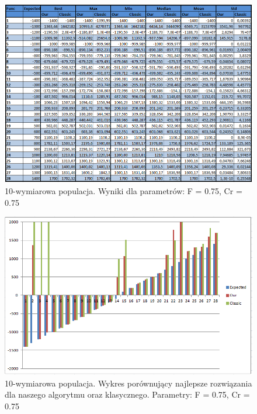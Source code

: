 \documentclass[a4paper]{article}
\begin{document}
\begin{figure}
\centering
\includegraphics[width=\textwidth]{F75Cr75L10tab.png}
\caption{10-wymiarowa populacja. Wyniki dla parametrów: F = 0.75, Cr = 0.75}
\end{figure}

\begin{figure}
\centering
\includegraphics[width=\textwidth]{F75Cr75L10chart.png}
\caption{10-wymiarowa populacja. Wykres porównujący najlepsze rozwiązania dla naszego algorytmu oraz klasycznego. Parametry: F = 0.75, Cr = 0.75}
\end{figure}
\end{document}
